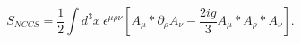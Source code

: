 \begin{equation}
  S_{NCCS} = \frac{1}{2} \int d^3 x~ \epsilon^{\mu \rho \nu}
  \left[
    A_\mu \ast \partial_\rho A_\nu
    - \frac{2ig}{3} A_\mu \ast A_\rho \ast A_\nu
  \right].
\end{equation}


